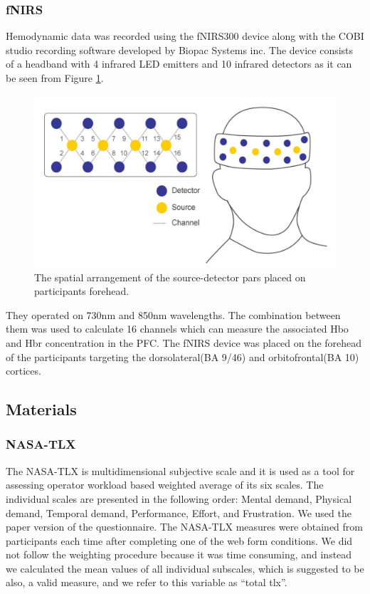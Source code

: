 \documentclass[../main/Feedback.tex]{subfiles}
\begin{document}
\subsubsection{fNIRS}
Hemodynamic data was recorded using the fNIRS300 device along with the COBI studio recording software developed by Biopac Systems inc. The device consists of a headband with 4 infrared LED emitters and 10 infrared detectors as it can be seen from Figure \ref{fig:source-detector-diagram}. 				
\begin{figure}[h]
	\centering
	\includegraphics[width=0.7\linewidth]{../figures/source-detector-diagram}
	\caption[fNIRS source-detector diagram]{The spatial arrangement of the source-detector pars placed on participants forehead.}
	\label{fig:source-detector-diagram}
\end{figure}
They operated on 730nm and 850nm wavelengths. The combination between them was used to calculate 16 channels which can measure the associated Hbo and Hbr concentration in the PFC. The fNIRS device was placed on the forehead of the participants targeting the dorsolateral(BA 9/46) and orbitofrontal(BA 10) cortices.
\subsection{Materials}
\subsubsection{NASA-TLX}
The NASA-TLX\cite{nasatlx} is multidimensional subjective scale and it is used as a tool for assessing operator workload based weighted average of its six scales. The individual scales are presented in the following order: Mental demand, Physical demand, Temporal demand, Performance, Effort, and Frustration. We used the paper version of the questionnaire. The NASA-TLX measures were obtained from participants each time after completing one of the web form conditions. We did not follow the weighting procedure because it was time consuming, and instead we calculated the mean values of all individual subscales, which is suggested to be also, a valid measure\cite{hart2006nasa}, and we refer to this variable as ``total tlx''.
\end{document}
